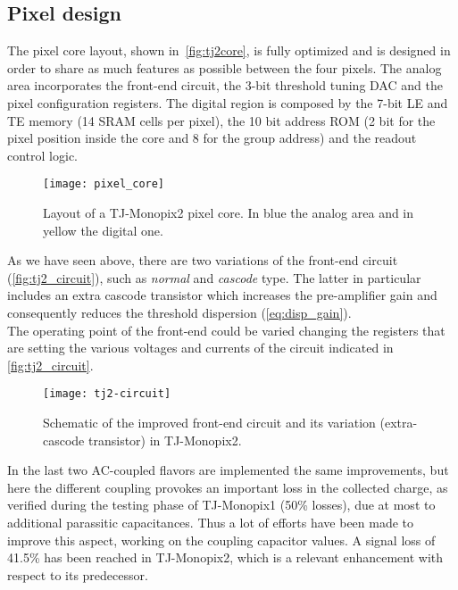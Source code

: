 
\subsection{Pixel design}\label{sec:improved_circuit}

The  pixel core layout, shown in~\autoref{fig:tj2core}, is fully optimized and is designed in order to share as much features as possible between the four pixels. The analog area incorporates the front-end circuit, the 3-bit threshold tuning DAC and the pixel configuration registers. The digital region is composed by the 7-bit LE and TE memory (14 SRAM cells per pixel), the 10 bit address ROM (2 bit for the pixel position inside the core and 8 for the group address) and the readout control logic. 

\begin{figure}[h!]
\centering
\texttt{[image: pixel\_core]}
\caption{Layout of a TJ-Monopix2  pixel core. In blue the analog area and in yellow the digital one.}
\label{fig:tj2core}
\end{figure}


As we have seen above, there are two variations of the front-end circuit (\autoref{fig:tj2_circuit}), such as \textit{normal} and \textit{cascode} type. The latter in particular includes an extra cascode transistor which increases the pre-amplifier gain and consequently reduces the threshold dispersion (\autoref{eq:disp_gain}).\\
The operating point of the front-end could be varied changing the registers that are setting the various voltages and currents of the circuit indicated in \autoref{fig:tj2_circuit}.


\begin{figure}[h!]
\centering
\texttt{[image: tj2-circuit]}
\caption{Schematic of the improved front-end circuit and its variation (extra-cascode transistor) in TJ-Monopix2.}
\label{fig:tj2_circuit}
\end{figure}


In the last two AC-coupled flavors are implemented the same improvements, but here the different coupling provokes an important loss in the collected charge, as verified during the testing phase of TJ-Monopix1 (50\% losses), due at most to additional parassitic capacitances. Thus a lot of efforts have been made to improve this aspect, working on the coupling capacitor values. A signal loss of 41.5\% has been reached in TJ-Monopix2, which is a relevant enhancement with respect to its predecessor.




